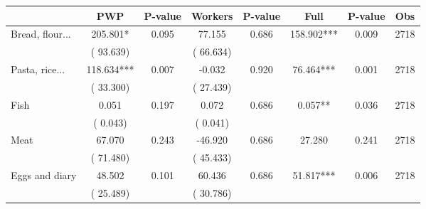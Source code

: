 
\begin{tabular}{l*{7}{c}}\hline&\multicolumn{1}{c}{PWP}&\multicolumn{1}{c}{P-value}&\multicolumn{1}{c}{Workers}&\multicolumn{1}{c}{P-value}&\multicolumn{1}{c}{Full}&\multicolumn{1}{c}{P-value}&\multicolumn{1}{c}{Obs} \\ \hline

 Bread, flour...       &            205.801*       &        0.095  &             77.155       &        0.686  &            158.902***       &              0.009 &  2718 \\ 
                       &       (      93.639)             &                               &       (      66.634)                     &                               &                                               &                                &                      \\ 

 Pasta, rice...       &            118.634***       &        0.007  &             -0.032       &        0.920  &             76.464***       &              0.001 &  2718 \\ 
                       &       (      33.300)             &                               &       (      27.439)                     &                               &                                               &                                &                      \\ 

 Fish       &              0.051       &        0.197  &              0.072       &        0.686  &              0.057**       &              0.036 &  2718 \\ 
                       &       (       0.043)             &                               &       (       0.041)                     &                               &                                               &                                &                      \\ 

 Meat       &             67.070       &        0.243  &            -46.920       &        0.686  &             27.280       &              0.241 &  2718 \\ 
                       &       (      71.480)             &                               &       (      45.433)                     &                               &                                               &                                &                      \\ 

 Eggs and diary       &             48.502       &        0.101  &             60.436       &        0.686  &             51.817***       &              0.006 &  2718 \\ 
                       &       (      25.489)             &                               &       (      30.786)                     &                               &                                               &                                &                      \\ 


\end{tabular}
